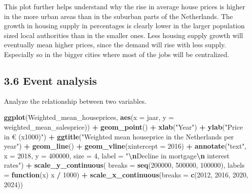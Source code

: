 \documentclass[
]{article}
\newenvironment{Shaded}{\begin{snugshade}}{\end{snugshade}}
\newcommand{\AttributeTok}[1]{\textcolor[rgb]{0.13,0.29,0.53}{#1}}
\newcommand{\ControlFlowTok}[1]{\textcolor[rgb]{0.13,0.29,0.53}{\textbf{#1}}}
\newcommand{\DecValTok}[1]{\textcolor[rgb]{0.00,0.00,0.81}{#1}}
\newcommand{\FunctionTok}[1]{\textcolor[rgb]{0.13,0.29,0.53}{\textbf{#1}}}
\newcommand{\NormalTok}[1]{#1}
\newcommand{\SpecialCharTok}[1]{\textcolor[rgb]{0.81,0.36,0.00}{\textbf{#1}}}
\newcommand{\StringTok}[1]{\textcolor[rgb]{0.31,0.60,0.02}{#1}}
\begin{document}
This plot further helps understand why the rise in average house prices
is higher in the more urban areas than in the suburban parts of the
Netherlands. The growth in housing supply in percentages is clearly
lower in the larger population sized local authorities than in the
smaller ones. Less housing supply growth will eventually mean higher
prices, since the demand will rise with less supply. Especially so in
the bigger cities where most of the jobs will be centralized.

\subsection{3.6 Event analysis}\label{event-analysis}

Analyze the relationship between two variables.

\begin{Shaded}
\begin{Highlighting}[]
\FunctionTok{ggplot}\NormalTok{(Weighted\_mean\_houseprices, }\FunctionTok{aes}\NormalTok{(}\AttributeTok{x =}\NormalTok{ jaar, }\AttributeTok{y =}\NormalTok{ weighted\_mean\_salesprice)) }\SpecialCharTok{+}
  \FunctionTok{geom\_point}\NormalTok{() }\SpecialCharTok{+}
  \FunctionTok{xlab}\NormalTok{(}\StringTok{"Year"}\NormalTok{) }\SpecialCharTok{+}
  \FunctionTok{ylab}\NormalTok{(}\StringTok{"Price in € (x1000)"}\NormalTok{) }\SpecialCharTok{+}
  \FunctionTok{ggtitle}\NormalTok{(}\StringTok{"Weighted mean houseprice in the Netherlands per year"}\NormalTok{) }\SpecialCharTok{+}
  \FunctionTok{geom\_line}\NormalTok{() }\SpecialCharTok{+}
  \FunctionTok{geom\_vline}\NormalTok{(}\AttributeTok{xintercept =} \DecValTok{2016}\NormalTok{) }\SpecialCharTok{+}
  \FunctionTok{annotate}\NormalTok{(}\StringTok{"text"}\NormalTok{, }\AttributeTok{x =} \DecValTok{2018}\NormalTok{, }\AttributeTok{y =} \DecValTok{400000}\NormalTok{, }\AttributeTok{size =} \DecValTok{4}\NormalTok{, }\AttributeTok{label =} \StringTok{"}\SpecialCharTok{\textbackslash{}n}\StringTok{Decline in mortgage}\SpecialCharTok{\textbackslash{}n}\StringTok{ interest rates"}\NormalTok{) }\SpecialCharTok{+}
  \FunctionTok{scale\_y\_continuous}\NormalTok{(}
    \AttributeTok{breaks =} \FunctionTok{seq}\NormalTok{(}\DecValTok{200000}\NormalTok{, }\DecValTok{500000}\NormalTok{, }\DecValTok{100000}\NormalTok{),    }
    \AttributeTok{labels =} \ControlFlowTok{function}\NormalTok{(x) x }\SpecialCharTok{/} \DecValTok{1000}\NormalTok{) }\SpecialCharTok{+}
  \FunctionTok{scale\_x\_continuous}\NormalTok{(}\AttributeTok{breaks =} \FunctionTok{c}\NormalTok{(}\DecValTok{2012}\NormalTok{, }\DecValTok{2016}\NormalTok{, }\DecValTok{2020}\NormalTok{, }\DecValTok{2024}\NormalTok{))}
\end{Highlighting}
\end{Shaded}
\end{document}
